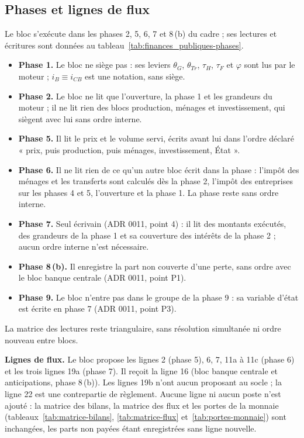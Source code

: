 \documentclass[11pt,a4paper]{article}
\begin{document}
\subsection{Phases et lignes de flux}
\label{sec:finances_publiques-phases}
\begin{proposee}
Le bloc s'exécute dans les phases 2, 5, 6, 7 et 8\,(b) du cadre ; ses lectures et écritures sont données au tableau~\ref{tab:finances_publiques-phases}.
\begin{itemize}
\item \textbf{Phase 1.} Le bloc ne siège pas : ses leviers $\theta_G$, $\theta_{\mathit{Tr}}$, $\tau_H$, $\tau_F$ et $\varphi$ sont lus par le moteur ; $i_B \equiv i_{\mathit{CB}}$ est une notation, sans siège.
\item \textbf{Phase 2.} Le bloc ne lit que l'ouverture, la phase 1 et les grandeurs du moteur ; il ne lit rien des blocs production, ménages et investissement, qui siègent avec lui sans ordre interne.
\item \textbf{Phase 5.} Il lit le prix et le volume servi, écrits avant lui dans l'ordre déclaré « prix, puis production, puis ménages, investissement, État ».
\item \textbf{Phase 6.} Il ne lit rien de ce qu'un autre bloc écrit dans la phase : l'impôt des ménages et les transferts sont calculés dès la phase 2, l'impôt des entreprises sur les phases 4 et 5, l'ouverture et la phase 1. La phase reste sans ordre interne.
\item \textbf{Phase 7.} Seul écrivain (ADR 0011, point 4) : il lit des montants exécutés, des grandeurs de la phase 1 et sa couverture des intérêts de la phase 2 ; aucun ordre interne n'est nécessaire.
\item \textbf{Phase 8\,(b).} Il enregistre la part non couverte d'une perte, sans ordre avec le bloc banque centrale (ADR 0011, point P1).
\item \textbf{Phase 9.} Le bloc n'entre pas dans le groupe de la phase 9 : sa variable d'état est écrite en phase 7 (ADR 0011, point P3).
\end{itemize}
La matrice des lectures reste triangulaire, sans résolution simultanée ni ordre nouveau entre blocs.

\textbf{Lignes de flux.} Le bloc propose les lignes 2 (phase 5), 6, 7, 11a à 11c (phase 6) et les trois lignes 19a (phase 7). Il reçoit la ligne 16 (bloc banque centrale et anticipations, phase 8\,(b)). Les lignes 19b n'ont aucun proposant au socle ; la ligne 22 est une contrepartie de règlement. Aucune ligne ni aucun poste n'est ajouté : la matrice des bilans, la matrice des flux et les portes de la monnaie (tableaux~\ref{tab:matrice-bilans}, \ref{tab:matrice-flux} et~\ref{tab:portes-monnaie}) sont inchangées, les parts non payées étant enregistrées sans ligne nouvelle.


\end{proposee}
\end{document}
